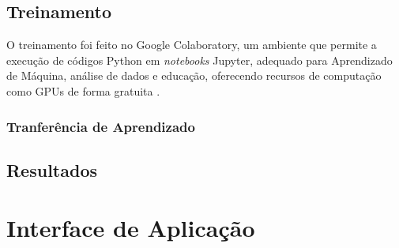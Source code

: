 \section{Treinamento} \label{cap:treinamento-treinamento}
O treinamento foi feito no Google Colaboratory, um ambiente que permite a execução de códigos Python em \textit{notebooks} Jupyter, adequado para Aprendizado de Máquina, análise de dados e educação, oferecendo recursos de computação como GPUs de forma gratuita \cite{ref:Colab}.



\subsection{Tranferência de Aprendizado} \label{cap:treinamento-rn}


\section{Resultados} \label{cap:treinamento-resultados}


\chapter{Interface de Aplicação} \label{cap:api}
